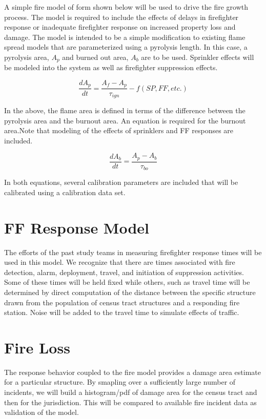 \documentclass[12pt,oneside]{article}
\begin{document}
A simple fire model of form shown below will be used to drive the fire growth process.  The model is required to include the effects of delays in firefighter response or inadequate firefighter response on increased property loss and damage.  The model is intended to be a simple modification to existing flame spread models that are parameterized using a pyrolysis length. In this case, a pyrolysis area, $A_p$  and burned out area, $A_b$  are to be used.  Sprinkler effects will be modeled into the system as well as firefighter suppression effects.

\begin{equation}
\frac{dA_p}{dt} = \frac{A_f-A_p}{\tau_{ign}} - f(SP,FF,etc.) 
\label{eq_AP}
\end{equation} 

In the above, the flame area is defined in terms of the difference between the pyrolysis area and the burnout area. An equation is required for the burnout area.Note that modeling of the effects of sprinklers and FF responses are included.  

\begin{equation}
\frac{dA_b}{dt} = \frac{A_p-A_b}{\tau_{bo}}
\label{eq_AB}
\end{equation} 
 
In both equations, several calibration parameters are included that will be calibrated using a calibration data set.

\section{FF Response Model}

The efforts of the past study teams in measuring firefighter response times will be used in this model.  We recognize that there are times associated with fire detection, alarm, deployment, travel, and initiation of suppression activities. Some of these times will be held fixed while others, such as travel time will be determined by direct computation of the distance between the specific structure drawn from the population of census tract structures and a responding fire station.  Noise will be added to the travel time to simulate effects of traffic. 


\section{Fire Loss}

The response behavior coupled to the fire model provides a damage area estimate for a particular structure.  By smapling over a sufficiently large number of incidents, we will build a histogram/pdf of damage area for the census tract and then for the jurisdiction.  This will be compared to available fire incident data as validation of the model.
\end{document}
